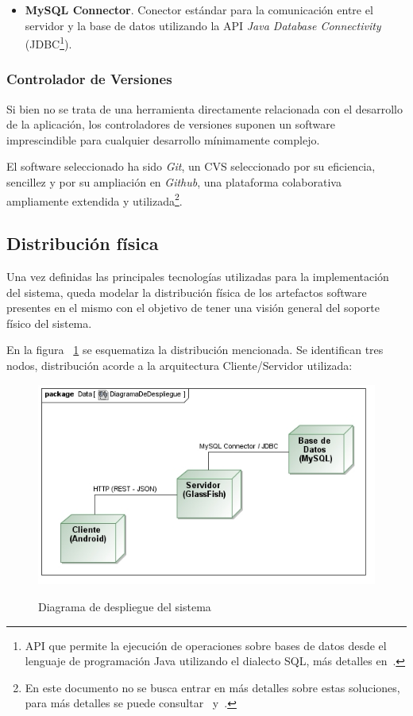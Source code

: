 \begin{itemize}
	\item \textbf{MySQL Connector}. Conector estándar para la comunicación entre el servidor y la base de datos utilizando la API \emph{Java Database Connectivity} (JDBC\footnote{API que permite la ejecución de operaciones sobre bases de datos desde el lenguaje de programación Java utilizando el dialecto SQL, más detalles en~\cite{OraDB}.}).
\end{itemize}

\subsubsection{Controlador de Versiones}

Si bien no se trata de una herramienta directamente relacionada con el desarrollo de la aplicación, los controladores de versiones suponen un software imprescindible para cualquier desarrollo mínimamente complejo.

El software seleccionado ha sido \emph{Git}, un CVS seleccionado por su eficiencia, sencillez y por su ampliación en \emph{Github}, una plataforma colaborativa ampliamente extendida y utilizada\footnote{En este documento no se busca entrar en más detalles sobre estas soluciones, para más detalles se puede consultar~\cite{Git} y~\cite{GitHb}.}.

\subsection{Distribución física}

Una vez definidas las principales tecnologías utilizadas para la implementación del sistema, queda modelar la distribución física de los artefactos software presentes en el mismo con el objetivo de tener una visión general del soporte físico del sistema.

En la figura ~\ref{fig:diagramaDespliegue} se esquematiza la distribución mencionada. Se identifican tres nodos, distribución acorde a la arquitectura Cliente/Servidor utilizada:

\begin{figure}
	\centering
	{\includegraphics[width=\linewidth,height=\textheight,keepaspectratio]{Images/Diagramas/09_DiagramaDeDespliegue}}
	\caption{Diagrama de despliegue del sistema}
	\label{fig:diagramaDespliegue}
\end{figure}

